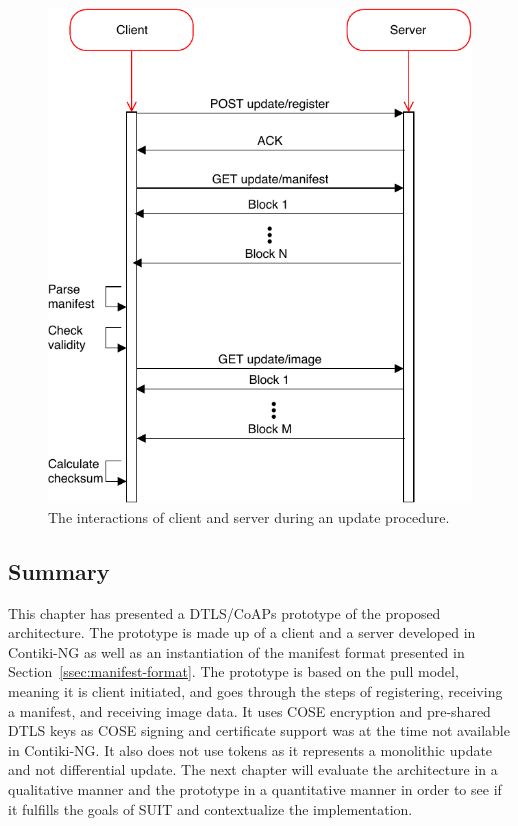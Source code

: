 \documentclass[0-thesis.tex]{subfiles}
\begin{document}
\begin{figure}[h!]
    \caption{The interactions of client and server during an update procedure.}
    \label{fig:client-server-interaction}
    \includegraphics{images/client-server-sequence.pdf}
\end{figure}

\subsection{Summary}
\label{ssec:implementation-summary}
This chapter has presented a DTLS/CoAPs prototype of the proposed architecture. The
prototype is made up of a client and a server developed in Contiki-NG as well as an
instantiation of the manifest format presented in Section~\ref{ssec:manifest-format}. The
prototype is based on the pull model, meaning it is client initiated, and goes through the
steps of registering, receiving a manifest, and receiving image data. It uses COSE
encryption and pre-shared DTLS keys as COSE signing and certificate support was at the
time not available in Contiki-NG. It also does not use tokens as it represents a
monolithic update and not differential update. The next chapter will evaluate the
architecture in a qualitative manner and the prototype in a quantitative manner in order
to see if it fulfills the goals of SUIT and contextualize the implementation.
\end{document}
